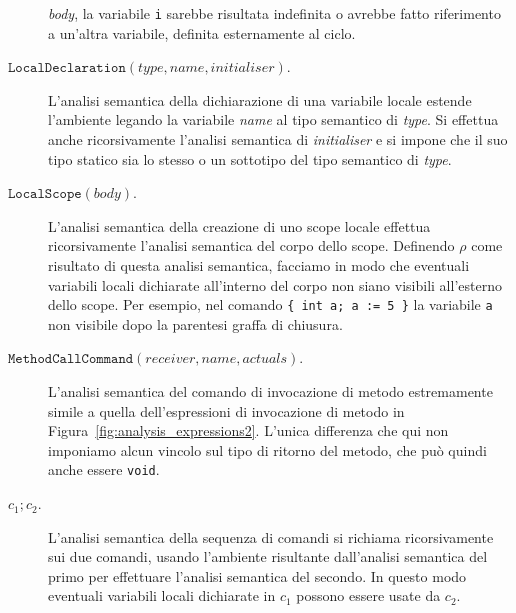 \begin{description}
  \emph{body},
  la variabile \texttt{i} sarebbe risultata indefinita o avrebbe fatto
  riferimento a un'altra variabile, definita esternamente al ciclo.
\item[\underline{$\mathtt{LocalDeclaration(\mathit{type},\mathit{name},\mathit{initialiser})}$}.]
  L'analisi semantica della dichiarazione di una variabile locale estende
  l'ambiente legando la variabile \textit{name} al tipo semantico di
  \textit{type}. Si effettua anche ricorsivamente
  l'analisi semantica di \textit{initialiser} e si impone che il suo tipo
  statico sia lo stesso o un sottotipo del tipo semantico di \textit{type}.
\item[\underline{$\mathtt{LocalScope(\mathit{body})}$}.]
  L'analisi semantica della creazione di uno scope locale effettua
  ricorsivamente l'analisi semantica del corpo dello scope. Definendo
  $\rho$ come risultato di questa analisi semantica, facciamo in modo che
  eventuali variabili locali dichiarate all'interno del corpo
  non siano \piu visibili all'esterno dello scope. Per esempio, nel comando
  \verb!{ int a; a := 5 }! la variabile
  \texttt{a} non \e \piu visibile dopo la parentesi graffa di chiusura.
\item[\underline{$\mathtt{MethodCallCommand(\mathit{receiver},\mathit{name},\mathit{actuals})}$}.]
  L'analisi semantica del comando di invocazione di metodo \e
  estremamente simile a quella dell'espressioni di invocazione di metodo
  in Figura~\ref{fig:analysis_expressions2}. L'unica differenza \e che qui
  non imponiamo alcun vincolo sul tipo di ritorno del metodo, che pu\`o
  quindi anche essere \texttt{void}.
\item[\underline{$c_1;c_2$}.]
  L'analisi semantica della sequenza di comandi si richiama ricorsivamente
  sui due comandi, usando l'ambiente risultante dall'analisi semantica del
  primo per effettuare l'analisi semantica del secondo. In questo modo
  eventuali variabili locali dichiarate in $c_1$ possono essere usate da $c_2$.
\end{description}
%
